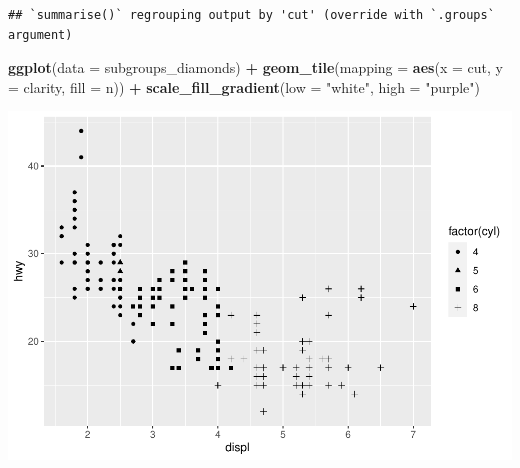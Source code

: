 \documentclass[
]{book}
\newenvironment{Shaded}{\begin{snugshade}}{\end{snugshade}}
\newcommand{\CommentTok}[1]{\textcolor[rgb]{0.56,0.35,0.01}{\textit{#1}}}
\newcommand{\DataTypeTok}[1]{\textcolor[rgb]{0.13,0.29,0.53}{#1}}
\newcommand{\KeywordTok}[1]{\textcolor[rgb]{0.13,0.29,0.53}{\textbf{#1}}}
\newcommand{\NormalTok}[1]{#1}
\newcommand{\OperatorTok}[1]{\textcolor[rgb]{0.81,0.36,0.00}{\textbf{#1}}}
\newcommand{\StringTok}[1]{\textcolor[rgb]{0.31,0.60,0.02}{#1}}
\begin{document}
\begin{Shaded}
\end{Shaded}

\begin{verbatim}
## `summarise()` regrouping output by 'cut' (override with `.groups` argument)
\end{verbatim}

\begin{Shaded}
\begin{Highlighting}[]
\KeywordTok{ggplot}\NormalTok{(}\DataTypeTok{data =}\NormalTok{ subgroups_diamonds) }\OperatorTok{+}\StringTok{ }\KeywordTok{geom_tile}\NormalTok{(}\DataTypeTok{mapping =} \KeywordTok{aes}\NormalTok{(}\DataTypeTok{x =}\NormalTok{ cut,}
    \DataTypeTok{y =}\NormalTok{ clarity, }\DataTypeTok{fill =}\NormalTok{ n)) }\OperatorTok{+}\StringTok{ }\KeywordTok{scale_fill_gradient}\NormalTok{(}\DataTypeTok{low =} \StringTok{"white"}\NormalTok{,}
    \DataTypeTok{high =} \StringTok{"purple"}\NormalTok{)}
\end{Highlighting}
\end{Shaded}

\includegraphics{_main_files/figure-latex/unnamed-chunk-255-3.pdf}

\begin{Shaded}
\end{Shaded}
\end{document}
